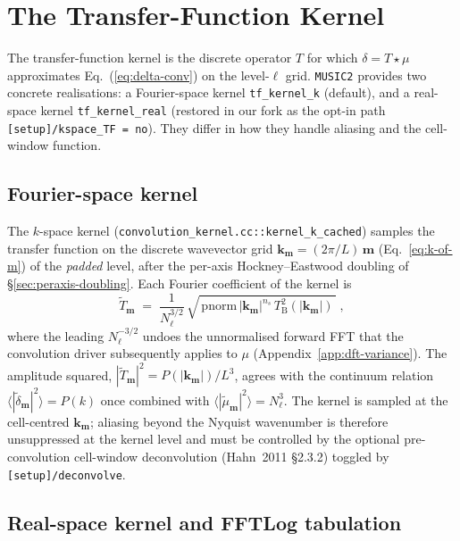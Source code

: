 \documentclass[12pt]{article}
\newcommand{\bk}{\mathbf{k}}
\newcommand{\bm}{\mathbf{m}}
\newcommand{\code}[1]{\texttt{#1}}
\begin{document}
\section{The Transfer-Function Kernel}
\label{sec:tf-kernel}

The transfer-function kernel is the discrete operator $T$ for which
$\delta = T \star \mu$ approximates Eq.~(\ref{eq:delta-conv}) on the
level-$\ell$ grid.  \texttt{MUSIC2} provides two concrete
realisations: a Fourier-space kernel \code{tf\_kernel\_k} (default),
and a real-space kernel \code{tf\_kernel\_real} (restored in our
fork as the opt-in path \code{[setup]/kspace\_TF = no}).  They differ
in how they handle aliasing and the cell-window function.

\subsection{Fourier-space kernel}
\label{sec:tf-k-space}

The $k$-space kernel
(\code{convolution\_kernel.cc::kernel\_k\_cached}) samples the
transfer function on the discrete wavevector grid
$\bk_\bm = (2\pi/L)\,\bm$ (Eq.~\ref{eq:k-of-m}) of the
\emph{padded} level, after the per-axis Hockney--Eastwood doubling
of \S\ref{sec:peraxis-doubling}.  Each Fourier coefficient of the
kernel is
\begin{equation}
  \tilde T_\bm \;=\; \frac{1}{N_\ell^{3/2}}\,
                    \sqrt{\,\mathrm{pnorm}\,\bigl|\bk_\bm\bigr|^{n_s}\,
                          T_\mathrm{B}^2(|\bk_\bm|)\,}\;,
  \label{eq:tf-k}
\end{equation}
where the leading $N_\ell^{-3/2}$ undoes the unnormalised forward FFT
that the convolution driver subsequently applies to $\mu$
(Appendix~\ref{app:dft-variance}).  The amplitude squared,
$|\tilde T_\bm|^2 = P(|\bk_\bm|)/L^3$, agrees with the continuum
relation $\langle |\tilde\delta_\bm|^2 \rangle = P(k)$ once
combined with $\langle |\tilde\mu_\bm|^2 \rangle = N_\ell^3$.  The
kernel is sampled at the cell-centred $\bk_\bm$; aliasing beyond the
Nyquist wavenumber is therefore unsuppressed at the kernel level and
must be controlled by the optional pre-convolution cell-window
deconvolution (Hahn~2011 \S2.3.2) toggled by
\code{[setup]/deconvolve}.

\subsection{Real-space kernel and FFTLog tabulation}
\label{sec:tf-r-space}
\end{document}
